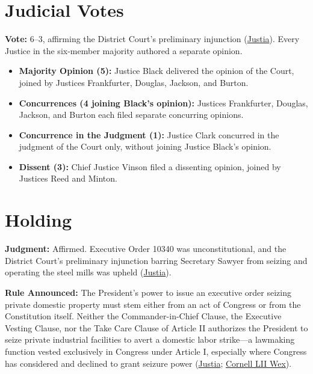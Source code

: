 \documentclass[12pt]{article}
\begin{document}
\section{Judicial Votes}
\textbf{Vote:} 6--3, affirming the District Court's preliminary injunction (\href{https://supreme.justia.com/cases/federal/us/343/579/}{Justia}). Every Justice in the six-member majority authored a separate opinion.
\begin{itemize}
\item \textbf{Majority Opinion (5):} Justice Black delivered the opinion of the Court, joined by Justices Frankfurter, Douglas, Jackson, and Burton.
\item \textbf{Concurrences (4 joining Black's opinion):} Justices Frankfurter, Douglas, Jackson, and Burton each filed separate concurring opinions.
\item \textbf{Concurrence in the Judgment (1):} Justice Clark concurred in the judgment of the Court only, without joining Justice Black's opinion.
\item \textbf{Dissent (3):} Chief Justice Vinson filed a dissenting opinion, joined by Justices Reed and Minton.
\end{itemize}

\section{Holding}
\textbf{Judgment:} Affirmed. Executive Order 10340 was unconstitutional, and the District Court's preliminary injunction barring Secretary Sawyer from seizing and operating the steel mills was upheld (\href{https://supreme.justia.com/cases/federal/us/343/579/}{Justia}).

\textbf{Rule Announced:} The President's power to issue an executive order seizing private domestic property must stem either from an act of Congress or from the Constitution itself. Neither the Commander-in-Chief Clause, the Executive Vesting Clause, nor the Take Care Clause of Article II authorizes the President to seize private industrial facilities to avert a domestic labor strike---a lawmaking function vested exclusively in Congress under Article I, especially where Congress has considered and declined to grant seizure power (\href{https://supreme.justia.com/cases/federal/us/343/579/}{Justia}; \href{https://www.law.cornell.edu/wex/youngstown_sheet_tube_co._v._sawyer_\%281952\%29}{Cornell LII Wex}).
\end{document}

